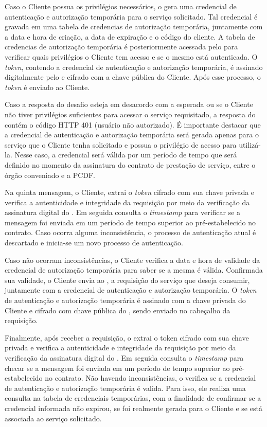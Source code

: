 Caso o Cliente possua os privil\'{e}gios necess\'{a}rios, o \servidorAA{} gera uma credencial de autenticação e autorização temporária para o serviço solicitado. Tal
credencial é gravada em uma tabela de credencias de autorização temporária, juntamente com a data e hora de criação, a
data de expiração e o código do cliente. A tabela de credencias de autorização temporária \'{e} posteriormente acessada pelo \servidorRest{}
para verificar quais privilégios o Cliente tem acesso e se o mesmo está autenticada. O \emph{token}, contendo a credencial de
autenticação e autorização temporária, é  assinado digitalmente pelo \servidorAA{} e cifrado  com a chave pública do Cliente.
Após esse processo, o \emph{token} é enviado ao Cliente.

Caso a resposta do desafio esteja em desacordo com a esperada ou se o Cliente não tiver privilégios
suficientes para acessar o serviço requisitado, a resposta do \servidorAA{} cont\'{e}m o c\'{o}digo HTTP 401 (usuário não autorizado).
É importante destacar que a credencial de autenticação e autorização temporária será gerada apenas para o serviço que o Cliente tenha
solicitado e possua o privilégio de acesso para utilizá-la. Nesse caso, a credencial
será válida por um período  de tempo que será definido no momento da assinatura do contrato de prestação de serviço,
entre o órgão conveniado e a PCDF.

Na quinta mensagem, o Cliente, extrai o \emph{token} cifrado com sua chave privada e verifica a autenticidade e integridade
da requisição por meio da verificação da assinatura digital do \servidorAA. Em seguida consulta
o \emph{timestamp} para verificar se a mensagem foi enviada em um período de tempo superior ao pré-estabelecido no contrato.
Caso ocorra alguma inconsist\^{e}ncia, o processo de autenticação atual é descartado e inicia-se um novo processo de autenticação.

Caso não ocorram inconsist\^{e}ncias, o Cliente verifica a data e hora de validade da credencial de autorização temporária para saber se a
mesma é válida. Confirmada sua validade, o Cliente envia ao \servidorRest, a requisição do serviço que deseja consumir,
juntamente com a credencial de autenticação e autorização temporária. O \emph{token} de autenticação e autorização
temporária é assinado com a chave privada do Cliente e cifrado com chave pública do \servidorRest,
sendo enviado no cabeçalho da requisição.

Finalmente, após receber a requisição, o \servidorRest{} extrai o token cifrado com sua chave privada e verifica a autenticidade
e integridade da requisição por meio da verificação da assinatura digital do \servidorAA.
Em seguida consulta o \emph{timestamp} para checar se a mensagem foi enviada em um período de
tempo superior ao pré-estabelecido no contrato. Não havendo inconsist\^{e}ncias, o \servidorRest{}
verifica se a credencial de autenticação e autorização temporária é valida. Para isso, ele realiza uma consulta na tabela de
credenciais temporárias, com a finalidade de confirmar se a credencial informada não expirou,
se  foi realmente gerada para o Cliente e se
está associada ao serviço solicitado.

